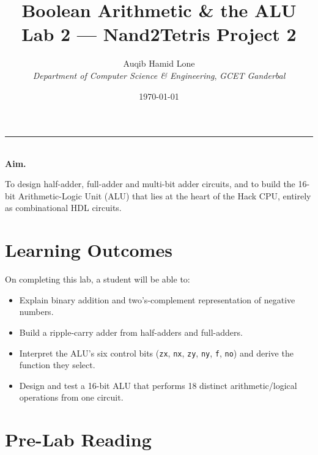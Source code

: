 \documentclass[11pt]{article}
\title{Boolean Arithmetic \& the ALU\\\large Lab 2 --- Nand2Tetris Project 2}
\author{Auqib Hamid Lone\\[0.3em]
  \emph{Department of Computer Science \& Engineering}, \emph{GCET Ganderbal}}
\date{\today}
\newenvironment{aimbox}{%
  \par\noindent\begin{minipage}{\linewidth}\vspace{0.4em}
  \textcolor{primary-blue}{\rule{\linewidth}{0.8pt}}\\[0.3em]
  \textbf{\textcolor{primary-blue}{Aim.}}\ \itshape
}{%
  \end{minipage}\vspace{0.4em}\par
}
\begin{document}
\maketitle

\begin{aimbox}
To design half-adder, full-adder and multi-bit adder circuits, and to build the 16-bit Arithmetic-Logic Unit (ALU) that lies at the heart of the Hack CPU, entirely as combinational HDL circuits.
\end{aimbox}

\section{Learning Outcomes}

On completing this lab, a student will be able to:
\begin{itemize}
  \item Explain binary addition and two's-complement representation of negative numbers.
  \item Build a ripple-carry adder from half-adders and full-adders.
  \item Interpret the ALU's six control bits (\texttt{zx}, \texttt{nx}, \texttt{zy}, \texttt{ny}, \texttt{f}, \texttt{no}) and derive the function they select.
  \item Design and test a 16-bit ALU that performs 18 distinct arithmetic/logical operations from one circuit.
\end{itemize}

\section{Pre-Lab Reading}
\end{document}

